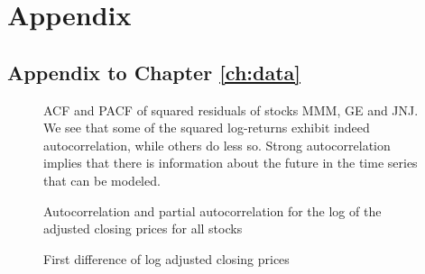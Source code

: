 \chapter{Appendix}\label{ch:appAlabel}


\section{Appendix to Chapter \ref{ch:data}}

\begin{figure}[H]
    \centering
    \begin{adjustbox}{width=.95\textwidth,center}
    
    \end{adjustbox}
    \begin{adjustbox}{width=.95\textwidth,center}
    
    \end{adjustbox}  
    \begin{adjustbox}{width=.95\textwidth,center}
    
    \end{adjustbox}  
    \caption{ACF and PACF of squared residuals of stocks MMM, GE and JNJ. We see that some of the squared log-returns exhibit indeed autocorrelation, while others do less so. Strong autocorrelation implies that there is information about the future in the time series that can be modeled.}
    \label{fig:ACF_selected_squared_log_returns}
\end{figure}{}

\begin{figure}[h]
    \centering
    \begin{adjustbox}{width=.85\textwidth,center}
    
    \end{adjustbox}  
    \caption{Autocorrelation and partial autocorrelation for the log of the adjusted closing prices for all stocks}
    \label{fig:acf_pacf_log_adjclose}
\end{figure}{}


\begin{figure}[h]
    \centering
    \begin{adjustbox}{width=.9\textwidth,center}
    
    \end{adjustbox}  
    \caption{First difference of log adjusted closing prices}
    \label{fig:all_fd_log_adjclose}
\end{figure}{}


